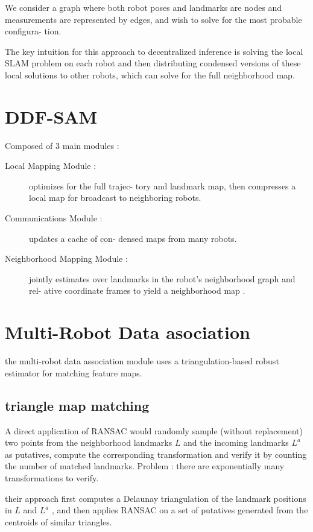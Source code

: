 \documentclass[twoside,twocolumn]{article}
\begin{document}
We consider a graph where both robot poses
and landmarks are nodes and measurements are represented
by edges, and wish to solve for the most probable configura-
tion.

The  key
intuition   for   this   approach   to   decentralized   inference   is
solving  the  local  SLAM  problem  on  each  robot  and  then
distributing  condensed  versions  of  these  local  solutions  to
other robots, which can solve for the full neighborhood map.



\section{DDF-SAM}
Composed of 3 main modules :
\begin{description}
  \item[Local Mapping Module
:]  optimizes  for  the  full  trajec-
tory and landmark map, then compresses a local map
for broadcast to neighboring robots.
 \item [Communications Module
:]  updates  a  cache  of  con-
densed maps from many robots.
\item [Neighborhood Mapping Module
:] jointly estimates over
landmarks in the robot’s neighborhood graph and rel-
ative coordinate frames to yield a
neighborhood map
.
\end{description}


\section{Multi-Robot Data asociation}
the multi-robot
data  association  module  uses  a  triangulation-based  robust
estimator  for  matching  feature  maps.

\subsection{triangle map matching}
A  direct  application  of  RANSAC  \cite{fischler_random_1981}  would  randomly
sample  (without  replacement)  two  points  from  the  neighborhood  landmarks
$L$
and  the  incoming  landmarks
$L^a$
as
putatives,  compute  the  corresponding  transformation  and
verify it by counting the number of matched landmarks.
Problem : there  are  exponentially  many  transformations  to
verify.

their approach  first  computes  a  Delaunay  triangulation
of  the  landmark  positions  in
$L$
and
$L^a$
,  and  then  applies
RANSAC on a set of putatives generated from the centroids
of  similar  triangles.
\end{document}

